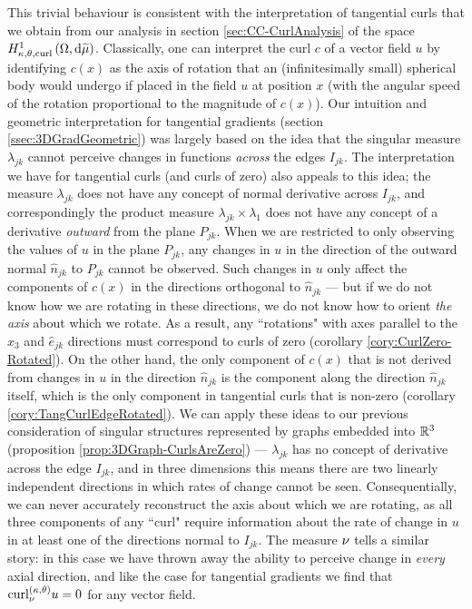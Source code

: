 This trivial behaviour is consistent with the interpretation of tangential curls that we obtain from our analysis in section \ref{sec:CC-CurlAnalysis} of the space $H^1_{\kappa,\theta,\mathrm{curl}}\left( \Omega, \mathrm{d}\widetilde{\mu} \right)$.
Classically, one can interpret the curl $c$ of a vector field $u$ by identifying $c(x)$ as the axis of rotation that an (infinitesimally small) spherical body would undergo if placed in the field $u$ at position $x$ (with the angular speed of the rotation proportional to the magnitude of $c(x)$).
Our intuition and geometric interpretation for tangential gradients (section \ref{ssec:3DGradGeometric}) was largely based on the idea that the singular measure $\lambda_{jk}$ cannot perceive changes in functions \emph{across} the edges $I_{jk}$.
The interpretation we have for tangential curls (and curls of zero) also appeals to this idea; the measure $\lambda_{jk}$ does not have any concept of normal derivative across $I_{jk}$, and correspondingly the product measure $\lambda_{jk}\times\lambda_1$ does not have any concept of a derivative \emph{outward} from the plane $P_{jk}$.
When we are restricted to only observing the values of $u$ in the plane $P_{jk}$, any changes in $u$ in the direction of the outward normal $\widehat{n}_{jk}$ to $P_{jk}$ cannot be observed.
Such changes in $u$ only affect the components of $c(x)$ in the directions orthogonal to $\widehat{n}_{jk}$ --- but if we do not know how we are rotating in these directions, we do not know how to orient \emph{the axis} about which we rotate.
As a result, any ``rotations" with axes parallel to the $\widehat{x}_3$ and $\widehat{e}_{jk}$ directions must correspond to curls of zero (corollary \ref{cory:CurlZero-Rotated}).
On the other hand, the only component of $c(x)$ that is not derived from changes in $u$ in the direction $\widehat{n}_{jk}$ is the component along the direction $\widehat{n}_{jk}$ itself, which is the only component in tangential curls that is non-zero (corollary \ref{cory:TangCurlEdgeRotated}).
We can apply these ideas to our previous consideration of singular structures represented by graphs embedded into $\mathbb{R}^3$ (proposition \ref{prop:3DGraph-CurlsAreZero}) ---  $\lambda_{jk}$ has no concept of derivative across the edge $I_{jk}$, and in three dimensions this means there are two linearly independent directions in which rates of change cannot be seen.
Consequentially, we can never accurately reconstruct the axis about which we are rotating, as all three components of any ``curl" require information about the rate of change in $u$ in at least one of the directions normal to $I_{jk}$.
The measure $\nu$ tells a similar story: in this case we have thrown away the ability to perceive change in \emph{every} axial direction, and like the case for tangential gradients we find that $\mathrm{curl}_{\nu}^{\left( \kappa, \theta \right)}u=0$ for any vector field.


